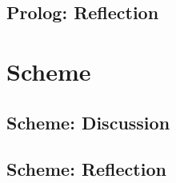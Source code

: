 \documentclass[
	12pt, %
]{fphw}
\begin{document}
\subsection{Prolog: Reflection}

\section{Scheme}

\subsection{Scheme: Discussion}

\subsection{Scheme: Reflection}
\end{document}
